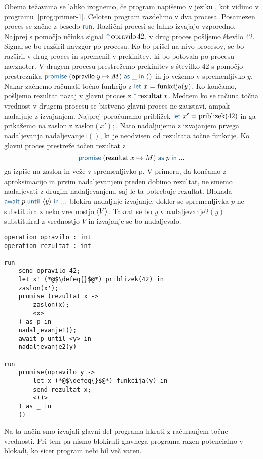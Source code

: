Obema težavama se lahko izognemo, če program napišemo v jeziku \aeff, kot vidimo v programu~\ref{prog:primer-1}. Celoten program razdelimo v dva procesa. Posamezen proces se začne z besedo $\tmkw{run}$. Različni procesi se lahko izvajajo vzporedno.
Najprej s pomočjo učinka signal $\tmkw{\uparrow}\, \text{opravilo}\,42;$ v drug proces pošljemo število $42$. Signal se bo razširil navzgor po procesu. Ko bo prišel na nivo procesov, se bo razširil v drug proces in spremenil v prekinitev, ki bo potovala po procesu navznoter. V drugem procesu prestrežemo prekinitev s številko $42$ s pomočjo prestreznika $\tmwith{opravilo}{y}{M}{\_}{()}$ in jo vežemo v spremenljivko $y$. Nakar začnemo računati točno funkcijo z $\tmkw{let}\ x = \text{funkcija}(y)$. Ko končamo, pošljemo rezultat nazaj v glavni proces z $\tmkw{\uparrow}\, \text{rezultat}\,x$.
Medtem ko se računa točna vrednost v drugem procesu se bistveno glavni proces ne zaustavi, ampak nadaljuje z izvajanjem. Najprej poračunamo približek $\tmkw{let}\ x' = \text{priblizek}(42)$ in ga prikažemo na zaslon z $\text{zaslon}(x');$. Nato nadaljujemo z izvajanjem prvega nadaljevanja $\text{nadaljevanje}1()$, ki je neodvisen od rezultata točne funkcije. Ko glavni proces prestreže točen rezultat z $$\tmwith{rezultat}{x}{M}{p}{...}$$ ga izpiše na zaslon in veže v spremenljivko p. V primeru, da končamo z aproksimacijo in prvim nadaljevanjem preden dobimo rezultat, ne smemo nadaljevati z drugim nadaljevanjem, saj le ta potrebuje rezultat. Blokada $\tmawait{p}{y}{...}$ blokira nadaljnje izvajanje, dokler se spremenljivka $p$ ne substituira z neko vrednostjo $\langle V \rangle$. Takrat se bo $y$ v $\text{nadaljevanje}2(y)$ substituiral z vrednostjo $V$ in izvajanje se bo nadaljevalo.

\begin{lstlisting}[caption={Asinhron vzporeden primer.},label={prog:primer-1},float,floatplacement=H]
operation opravilo : int
operation rezultat : int

run 
	send opravilo 42;
	let x' (*@$\defeq{}$@*) priblizek(42) in
	zaslon(x');
	promise (rezultat x ->
	   	zaslon(x);
	   	<x>
	) as p in
	nadaljevanje1();
	await p until <y> in
	nadaljevanje2(y)

run 
	promise(opravilo y ->
	   	let x (*@$\defeq{}$@*) funkcija(y) in
	   	send rezultat x;
	   	<()>
	) as _ in
	()
\end{lstlisting}

Na ta način smo izvajali glavni del programa hkrati z računanjem točne vrednosti. Pri tem pa nismo blokirali glavnega programa razen potencialno v blokadi, ko sicer program nebi bil več varen.
